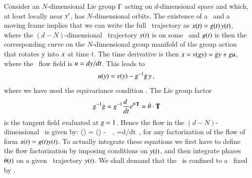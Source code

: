 Consider an $N$-dimensional Lie group $\Gamma$ acting on $d$-dimensional
space and which, at least locally near ${y'}$, has $N$-dimensional orbits.
The existence of a \slice\ and a moving frame implies that we can 
write the full \statesp\
trajectory as $x(t)= g(t)\,y(t)$, where the
$(d\!-\!N)$-dimensional \reducedsp\ trajectory $y(t)$
is on some \slice\, and $g(t)$ is then the
corresponding curve on the $N$-dimensional group manifold of
the group action that rotates $y$ into $x$ at time
$t$. The time derivative is then $\dot{x}=
v(gy) = \dot{g}y + gu$,
where the \reducedsp\ flow field is
$u={dy}/{dt}$. This leads to
\[
u(y) = v(y) - g^{-1} \dot{g} \, y
\,,
\]
where we have used the equivariance condition
. The Lie group factor
\[
g^{-1} \dot{g} =
g^{-1}\frac{d~}{dt} e^{{\bf \theta} \cdot \mathbf{T} } =
\dot{{\bf \theta}} \cdot \mathbf{T}
\]
is the tangent field evaluated at ${g} = 1$.
Hence the flow in the
$(d\!-\!N)$-dimensional \reducedsp\ is given by:
\beq
\velRed(\sspRed) = \vel(\sspRed) - \dot{\gSpace} \cdot \Lg \, \sspRed
\,,\qquad
\velRed={d\sspRed}/{dt}
\,,
for any factorization of the flow of form $x(t)=
g(t)y(t)$. To actually integrate these equations
we first have to define the flow factorization by imposing
conditions on $y(t)$, and then integrate phases
${\bf \theta}(t)$ on a given \reducedsp\ trajectory $y(t)$.
We shall demand that the \reducedsp\ is confined to a \slice\
fixed by .

